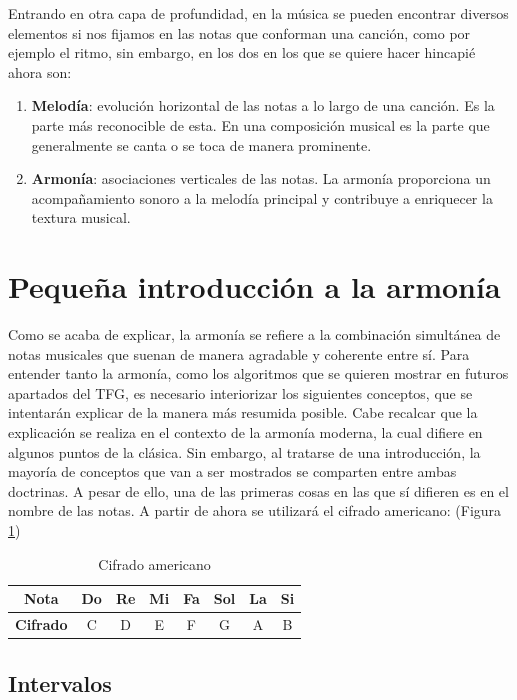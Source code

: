 Entrando en otra capa de profundidad, en la música se pueden encontrar diversos elementos si nos fijamos en las notas que conforman una canción, como por ejemplo el ritmo, sin embargo, en los dos en los que se quiere hacer hincapié ahora son:
\begin{enumerate}
    \item[\textbullet] \textbf{Melodía}: evolución horizontal de las notas a lo largo de una canción. Es la parte más reconocible de esta. En una composición musical es la parte que generalmente se canta o se toca de manera prominente. 
    \item[\textbullet] \textbf{Armonía}: asociaciones verticales de las notas. La armonía proporciona un acompañamiento sonoro a la melodía principal y contribuye a enriquecer la textura musical. 
\end{enumerate}

\section{Pequeña introducción a la armonía}

Como se acaba de explicar, la armonía se refiere a la combinación simultánea de notas musicales que suenan de manera agradable y coherente entre sí. Para entender tanto la armonía, como los algoritmos que se quieren mostrar en futuros apartados del TFG, es necesario interiorizar los siguientes conceptos, que se intentarán explicar de la manera más resumida posible. Cabe recalcar que la explicación se realiza en el contexto de la armonía moderna, la cual difiere en algunos puntos de la clásica. Sin embargo, al tratarse de una introducción, la mayoría de conceptos que van a ser mostrados se comparten entre ambas doctrinas. A pesar de ello, una de las primeras cosas en las que sí difieren es en el nombre de las notas. A partir de ahora se utilizará el cifrado americano: (Figura \ref{tab:cifrado_americano})

\begin{table}[h]
    \centering
    \begin{tabular}{c||c|c|c|c|c|c|c}
        \textbf{Nota} & Do & Re & Mi & Fa & Sol & La & Si \\
        \hline
        \textbf{Cifrado} & C & D & E & F & G & A & B \\
    \end{tabular}
    \caption{Cifrado americano}
    \label{tab:cifrado_americano}
\end{table}    

\subsection{Intervalos}\label{sec:arm:intervalos}


